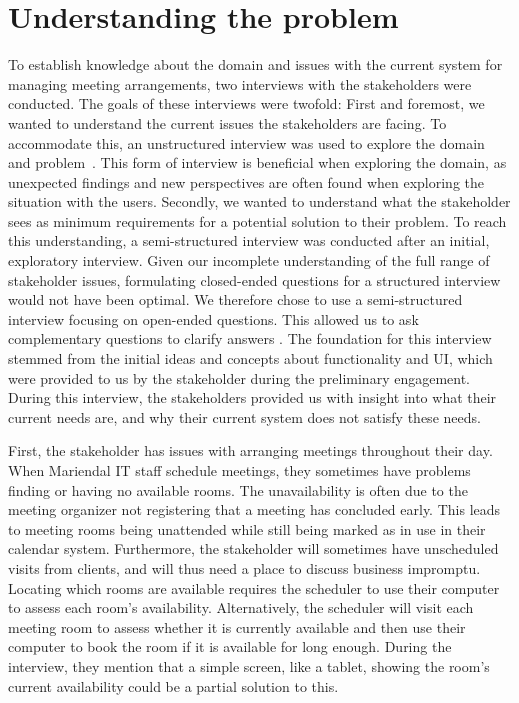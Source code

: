 \section{Understanding the problem}\label{sec:understanding_the_problem} %
To establish knowledge about the domain and issues with the current system for managing meeting arrangements, two interviews with the stakeholders were conducted. 
The goals of these interviews were twofold: 
First and foremost, we wanted to understand the current issues the stakeholders are facing. 
To accommodate this, an unstructured interview was used to explore the domain and problem~\cite{benyon2013designing}. 
This form of interview is beneficial when exploring the domain, as unexpected findings and new perspectives are often found when exploring the situation with the users\cite{benyon2013designing}.
Secondly, we wanted to understand what the stakeholder sees as minimum requirements for a potential solution to their problem. 
To reach this understanding, a semi-structured interview was conducted after an initial, exploratory interview.
Given our incomplete understanding of the full range of stakeholder issues, formulating closed-ended questions for a structured interview would not have been optimal.
We therefore chose to use a semi-structured interview focusing on open-ended questions. This allowed us to ask complementary questions to clarify answers \cite{InterviewsNHS}.
The foundation for this interview stemmed from the initial ideas and concepts about functionality and UI, which were provided to us by the stakeholder during the preliminary engagement.
During this interview, the stakeholders provided us with insight into what their current needs are, and why their current system does not satisfy these needs.

First, the stakeholder has issues with arranging meetings throughout their day.
When Mariendal IT staff schedule meetings, they sometimes have problems finding or having no available rooms.
The unavailability is often due to the meeting organizer not registering that a meeting has concluded early.
This leads to meeting rooms being unattended while still being marked as in use in their calendar system.
Furthermore, the stakeholder will sometimes have unscheduled visits from clients, and will thus need a place to discuss business impromptu. 
Locating which rooms are available requires the scheduler to use their computer to assess each room's availability.
Alternatively, the scheduler will visit each meeting room to assess whether it is currently available and then use their computer to book the room if it is available for long enough.
During the interview, they mention that a simple screen, like a tablet, showing the room's current availability could be a partial solution to this.

